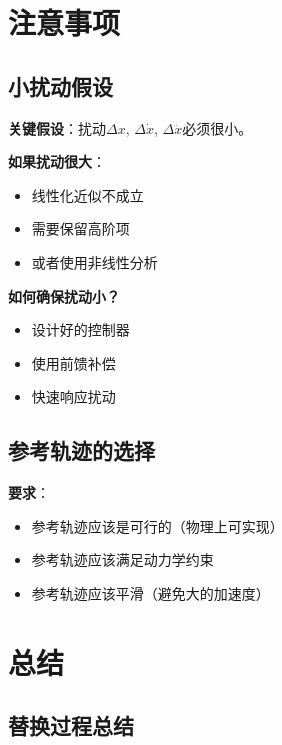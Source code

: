 \documentclass[12pt,a4paper]{article}
\begin{document}
\section{注意事项}

\subsection{小扰动假设}

\textbf{关键假设}：扰动$\Delta x$, $\Delta \dot{x}$, $\Delta \ddot{x}$必须很小。

\textbf{如果扰动很大}：
\begin{itemize}
\item 线性化近似不成立
\item 需要保留高阶项
\item 或者使用非线性分析
\end{itemize}

\textbf{如何确保扰动小？}
\begin{itemize}
\item 设计好的控制器
\item 使用前馈补偿
\item 快速响应扰动
\end{itemize}

\subsection{参考轨迹的选择}

\textbf{要求}：
\begin{itemize}
\item 参考轨迹应该是可行的（物理上可实现）
\item 参考轨迹应该满足动力学约束
\item 参考轨迹应该平滑（避免大的加速度）
\end{itemize}

\section{总结}

\subsection{替换过程总结}
\end{document}
